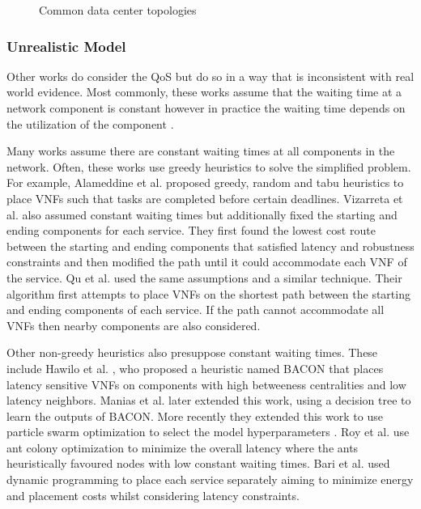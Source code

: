 \begin{figure}[t]
\begin{minipage}{.15\columnwidth}
    \end{minipage}

    \vspace{1em}
    \caption{Common data center topologies}
    \label{fig:topologies}

	\vspace{1em}
\end{figure}

\subsubsection{Unrealistic Model}
Other works do consider the QoS but do so in a way that is inconsistent with real world evidence. Most commonly, these works assume that the waiting time at a network component is constant however in practice the waiting time depends on the utilization of the component \cite{IntelDPDK, IntelPPP, OljiraGTB17}.

Many works assume there are constant waiting times at all components in the network. Often, these works use greedy heuristics to solve the simplified problem. For example, Alameddine et al. \cite{AlameddineQA17} proposed greedy, random and tabu heuristics to place VNFs such that tasks are completed before certain deadlines. Vizarreta et al. \cite{VizarretaCMMK17} also assumed constant waiting times but additionally fixed the starting and ending components for each service. They first found the lowest cost route between the starting and ending components that satisfied latency and robustness constraints and then modified the path until it could accommodate each VNF of the service. Qu et al. \cite{QuASK17} used the same assumptions and a similar technique. Their algorithm first attempts to place VNFs on the shortest path between the starting and ending components of each service. If the path cannot accommodate all VNFs then nearby components are also considered.

Other non-greedy heuristics also presuppose constant waiting times. These include Hawilo et al. \cite{HawiloJS19}, who proposed a heuristic named BACON that places latency sensitive VNFs on components with high betweeness centralities and low latency neighbors. Manias et al. \cite{ManiasJHSHLB19} later extended this work, using a decision tree to learn the outputs of BACON. More recently they extended this work to use particle swarm optimization to select the model hyperparameters \cite{ManiasHJS20}. Roy et al. \cite{RoyTSARH20} use ant colony optimization to minimize the overall latency where the ants heuristically favoured nodes with low constant waiting times. Bari et al. \cite{BariCAB15} used dynamic programming to place each service separately aiming to minimize energy and placement costs whilst considering latency constraints.

